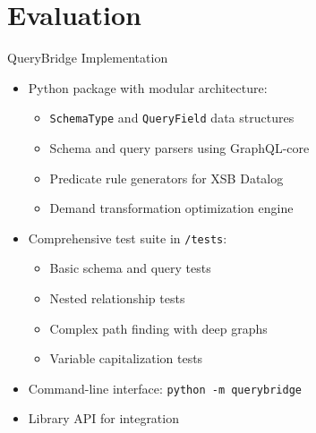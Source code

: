 \documentclass{beamer}
\begin{document}
\section{Evaluation}
\begin{frame}{QueryBridge Implementation}
  \begin{itemize}
    \item Python package with modular architecture:
    \begin{itemize}
      \item \texttt{SchemaType} and \texttt{QueryField} data structures
      \item Schema and query parsers using GraphQL-core
      \item Predicate rule generators for XSB Datalog
      \item Demand transformation optimization engine
    \end{itemize}
    \item Comprehensive test suite in \texttt{/tests}:
    \begin{itemize}
      \item Basic schema and query tests
      \item Nested relationship tests
      \item Complex path finding with deep graphs
      \item Variable capitalization tests
    \end{itemize}
    \item Command-line interface: \texttt{python -m querybridge}
    \item Library API for integration
  \end{itemize}
\end{frame}
\end{document}
